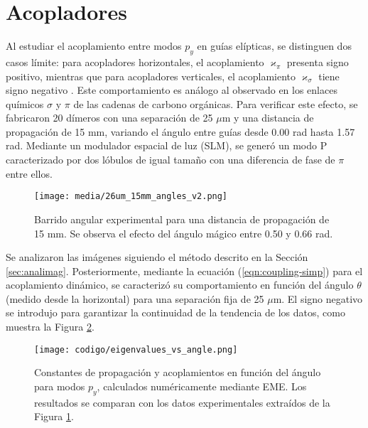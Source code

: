 \section{Acopladores}
Al estudiar el acoplamiento entre modos $p_y$ en guías elípticas, se distinguen dos casos límite: para acopladores horizontales, el acoplamiento $\varkappa_\pi$ presenta signo positivo, mientras que para acopladores verticales, el acoplamiento $\varkappa_\sigma$ tiene signo negativo \cite{Pmodecoupling}.
Este comportamiento es análogo al observado en los enlaces químicos $\sigma$ y $\pi$ de las cadenas de carbono orgánicas. Para verificar este efecto, se fabricaron 20 dímeros con una separación de 25 $\mu$m y una distancia de propagación de 15 mm, variando el ángulo entre guías desde 0.00 rad hasta 1.57 rad. Mediante un modulador espacial de luz (SLM), se generó un modo P caracterizado por dos lóbulos de igual tamaño con una diferencia de fase de $\pi$ entre ellos.
\begin{figure}[H]
    \centering
    \texttt{[image: media/26um\_15mm\_angles\_v2.png]}
    \caption[Barrido angular experimental]{Barrido angular experimental para una distancia de propagación de 15 mm. Se observa el efecto del ángulo mágico entre 0.50 y 0.66 rad. \label{fig:angulobarrido}}
\end{figure} \vspace{-2ex} Se analizaron las imágenes siguiendo el método descrito en la Sección \ref{sec:analimag}. Posteriormente, mediante la ecuación (\ref{eqn:coupling-simp}) para el acoplamiento dinámico, se caracterizó su comportamiento en función del ángulo $\theta$ (medido desde la horizontal) para una separación fija de 25 $\mu$m. El signo negativo se introdujo para garantizar la continuidad de la tendencia de los datos, como muestra la Figura \ref{fig:invisibility-coup}.
\begin{figure}[H]
    \centering
    \texttt{[image: codigo/eigenvalues\_vs\_angle.png]}
    \caption[Constantes de propagación y acoplamientos angulares para modos P]{Constantes de propagación y acoplamientos en función del ángulo para modos $p_y$, calculados numéricamente mediante EME. Los resultados se comparan con los datos experimentales extraídos de la Figura \ref{fig:angulobarrido}. \label{fig:invisibility-coup}}
\end{figure} \vspace{-2ex}
